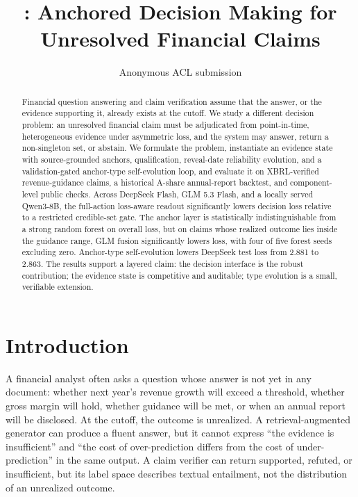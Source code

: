 \documentclass[11pt]{article}
\title{\method: Anchored Decision Making for Unresolved Financial Claims}
\author{Anonymous ACL submission}
\begin{document}
\maketitle

\begin{abstract}
Financial question answering and claim verification assume that the answer, or the evidence supporting it, already exists at the cutoff. We study a different decision problem: an unresolved financial claim must be adjudicated from point-in-time, heterogeneous evidence under asymmetric loss, and the system may answer, return a non-singleton set, or abstain. We formulate the problem, instantiate an evidence state with source-grounded anchors, qualification, reveal-date reliability evolution, and a validation-gated anchor-type self-evolution loop, and evaluate it on XBRL-verified revenue-guidance claims, a historical A-share annual-report backtest, and component-level public checks. Across DeepSeek Flash, GLM 5.3 Flash, and a locally served Qwen3-8B, the full-action loss-aware readout significantly lowers decision loss relative to a restricted credible-set gate. The anchor layer is statistically indistinguishable from a strong random forest on overall loss, but on claims whose realized outcome lies inside the guidance range, GLM fusion significantly lowers loss, with four of five forest seeds excluding zero. Anchor-type self-evolution lowers DeepSeek test loss from 2.881 to 2.863. The results support a layered claim: the decision interface is the robust contribution; the evidence state is competitive and auditable; type evolution is a small, verifiable extension.
\end{abstract}

\section{Introduction}

A financial analyst often asks a question whose answer is not yet in any document: whether next year's revenue growth will exceed a threshold, whether gross margin will hold, whether guidance will be met, or when an annual report will be disclosed. At the cutoff, the outcome is unrealized. A retrieval-augmented generator can produce a fluent answer, but it cannot express ``the evidence is insufficient'' and ``the cost of over-prediction differs from the cost of under-prediction'' in the same output. A claim verifier can return supported, refuted, or insufficient, but its label space describes textual entailment, not the distribution of an unrealized outcome.
\end{document}
